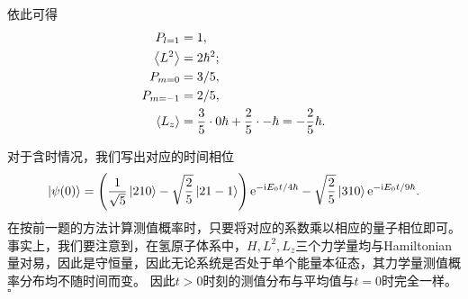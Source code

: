 \begin{tcolorbox}[breakable, title={\textbf{例题：氢原子能级叠加态}}]
    依此可得
    \begin{equation}
    \begin{aligned}
        P_{l=1} &= 1, \\
        \expval{L^2} &= 2\hbar^2; \\
        P_{m=0} &= 3/5, \\
        P_{m=-1} &= 2/5, \\
        \expval{L_z} &= \frac35 \cdot 0\hbar + \frac25 \cdot -\hbar = -\frac25\hbar.
    \end{aligned}
    \end{equation}

    对于含时情况，我们写出对应的时间相位
    \begin{equation}
        \ket{\psi(0)} = \left(\frac{1}{\sqrt{5}}\ket{210} - \sqrt{\frac25}\ket{21-1}\right) \mathrm{e}^{-\mathrm{i} E_0 t/4\hbar} - \sqrt{\frac25}\ket{310} \mathrm{e}^{-\mathrm{i} E_0 t/9\hbar}.
    \end{equation}
    在按前一题的方法计算测值概率时，只要将对应的系数乘以相应的量子相位即可。
    事实上，我们要注意到，在氢原子体系中，$H, L^2, L_z$三个力学量均与Hamiltonian量对易，因此是守恒量，因此无论系统是否处于单个能量本征态，其力学量测值概率分布均不随时间而变。
    因此$t>0$时刻的测值分布与平均值与$t=0$时完全一样。
    \hfill $\square$

\end{tcolorbox}

